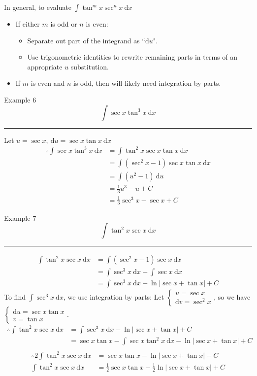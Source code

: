 \documentclass[12pt,a4paper]{article}
\def\d{{\mathrm{d}}}
\begin{document}
\begin{thm}{In general, to evaluate $\displaystyle\int\tan^mx\sec^nx\ \d x$}
	\begin{itemize}
		\item If either $m$ is odd or $n$ is even: 
		\begin{itemize}
			\item Separate out part of the integrand as ``$\d u$".
			\item Use trigonometric identities to rewrite remaining parts in terms of an appropriate $u$ substitution. 
		\end{itemize}
		\item If $m$ is even and $n$ is odd, then will likely need integration by parts. 
	\end{itemize}
\end{thm}
\begin{eg}{Example 6}
	$$\int\sec{x}\tan^3x\ \d x$$
	\noindent\rule[0.25\baselineskip]{\textwidth}{1pt}
	Let $u=\sec{x},\ \d u=\sec{x}\tan{x}\ \d x$
	$$\begin{aligned}
		\therefore\int\sec{x}\tan^3x\ \d x&=\int\tan^2x\sec{x}\tan{x}\ \d x\\
		&=\int\left(\sec^2{x}-1\right)\sec{x}\tan{x}\ \d x\\
		&=\int\left(u^2-1\right)\ \d u\\
		&=\frac{1}{3}u^3-u+C\\
		&=\frac{1}{3}\sec^3x-\sec{x}+C
	\end{aligned}$$
\end{eg}
\begin{eg}{Example 7}
	$$\int\tan^2x\sec x\ \d x$$
	\noindent\rule[0.25\baselineskip]{\textwidth}{1pt}
	$$\begin{aligned}
		\int\tan^2x\sec{x}\ \d x&=\int\left(\sec^2x-1\right)\sec{x}\ \d x\\
		&=\int\sec^3x\ \d x-\int\sec{x}\ \d x\\
		&=\int\sec^3x\ \d x-\ln\left|\sec{x}+\tan{x}\right|+C
	\end{aligned}$$
	To find $\int\sec^3x\ \d x$, we use integration by parts: Let $\begin{cases}u=\sec{x}\\\d v=\sec^2x\end{cases}$, so we have $\begin{cases}\d u=\sec{x}\tan{x}\\v=\tan{x}\end{cases}$.
	$$\begin{aligned}
		\therefore \boxed{\int\tan^2x\sec{x}\ \d x}&=\int\sec^3x\ \d x-\ln\left|\sec{x}+\tan{x}\right|+C\\
		&=\sec{x}\tan{x}-\boxed{\int\sec{x}\tan^2x\ \d x}-\ln\left|\sec{x}+\tan{x}\right|+C\\
	\end{aligned}$$
	$$\begin{aligned}
		\therefore 2\int\tan^2x\sec{x}\ \d x&=\sec{x}\tan{x}-\ln\left|\sec{x}+\tan{x}\right|+C\\
		\int\tan^2x\sec{x}\ \d x&=\frac{1}{2}\sec{x}\tan{x}-\frac{1}{2}\ln\left|\sec{x}+\tan{x}\right|+C
	\end{aligned}$$
\end{eg}
\end{document}
